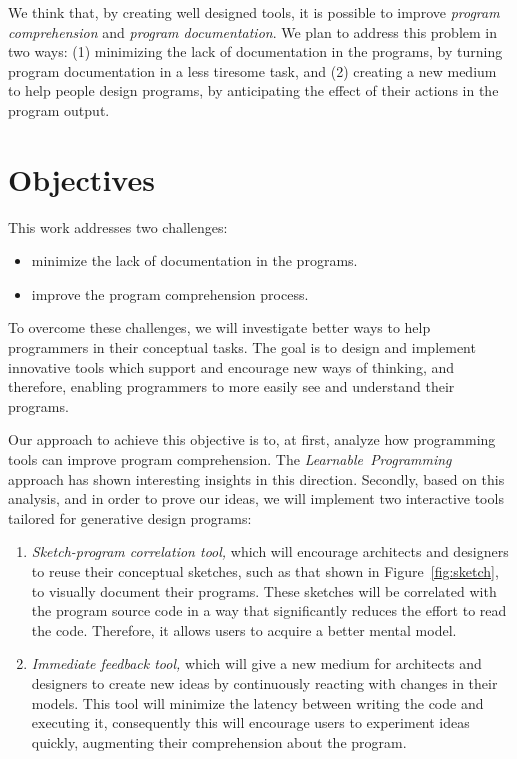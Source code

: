 We think that, by creating well designed tools, it is possible to improve \textit{program comprehension} and \textit{program documentation}. We plan to address this problem in two ways: (1) minimizing the lack of documentation in the programs, by turning program documentation in a less tiresome task, and (2) creating a new medium to help people design programs, by anticipating the effect of their actions in the program output.

\section{Objectives}

This work addresses two challenges:

\begin{itemize}
\item minimize the lack of documentation in the programs.
\item improve the program comprehension process.
\end{itemize}

To overcome these challenges, we will investigate better ways to help programmers in their conceptual tasks. The goal is to design and implement innovative tools which support and encourage new ways of thinking, and therefore, enabling programmers to more easily see and understand their programs.

Our approach to achieve this objective is to, at first, analyze how programming tools can improve program comprehension. The \textit{Learnable~Programming}~\citep{learnableProg,inventingPrin} approach has shown interesting insights in this direction. Secondly, based on this analysis, and in order to prove our ideas, we will implement two interactive tools tailored for generative design programs: 

\begin{enumerate}
\item \textit{Sketch-program correlation tool,} which will encourage architects and designers to reuse their conceptual sketches, such as that shown in Figure~\ref{fig:sketch}, to visually document their programs. These sketches will be correlated with the program source code in a way that significantly reduces the effort to read the code. Therefore, it allows users to acquire a better mental model.

\item \textit{Immediate feedback tool,} which will give a new medium for architects and designers to create new ideas by continuously reacting with changes in their models. This tool will minimize the latency between writing the code and executing it, consequently this will encourage users to experiment ideas quickly, augmenting their comprehension about the program.
\end{enumerate}

